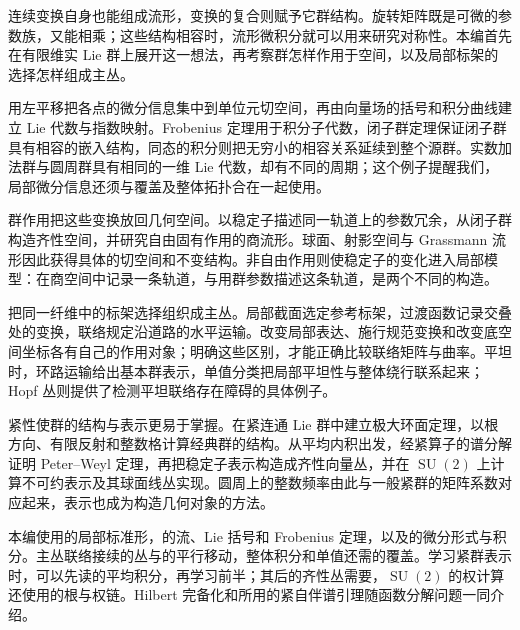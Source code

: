 
% 

\BookPartGuide
连续变换自身也能组成流形，变换的复合则赋予它群结构。旋转矩阵既是可微的参数族，又能相乘；这些结构相容时，流形微积分就可以用来研究对称性。本编首先在有限维实 Lie 群上展开这一想法，再考察群怎样作用于空间，以及局部标架的选择怎样组成主丛。

\ProseParagraphBreak

用左平移把各点的微分信息集中到单位元切空间，再由向量场的括号和积分曲线建立 Lie 代数与指数映射。Frobenius 定理用于积分子代数，闭子群定理保证闭子群具有相容的嵌入结构，同态的积分则把无穷小的相容关系延续到整个源群。实数加法群与圆周群具有相同的一维 Lie 代数，却有不同的周期；这个例子提醒我们，局部微分信息还须与覆盖及整体拓扑合在一起使用。

\ProseParagraphBreak

群作用把这些变换放回几何空间。以稳定子描述同一轨道上的参数冗余，从闭子群构造齐性空间，并研究自由固有作用的商流形。球面、射影空间与 Grassmann 流形因此获得具体的切空间和不变结构。非自由作用则使稳定子的变化进入局部模型：在商空间中记录一条轨道，与用群参数描述这条轨道，是两个不同的构造。

\ProseParagraphBreak

把同一纤维中的标架选择组织成主丛。局部截面选定参考标架，过渡函数记录交叠处的变换，联络规定沿道路的水平运输。改变局部表达、施行规范变换和改变底空间坐标各有自己的作用对象；明确这些区别，才能正确比较联络矩阵与曲率。平坦时，环路运输给出基本群表示，单值分类把局部平坦性与整体绕行联系起来；Hopf 丛则提供了检测平坦联络存在障碍的具体例子。

\ProseParagraphBreak

紧性使群的结构与表示更易于掌握。在紧连通 Lie 群中建立极大环面定理，以根方向、有限反射和整数格计算经典群的结构。从平均内积出发，经紧算子的谱分解证明 Peter--Weyl 定理，再把稳定子表示构造成齐性向量丛，并在 \(\operatorname{SU}(2)\) 上计算不可约表示及其球面线丛实现。圆周上的整数频率由此与一般紧群的矩阵系数对应起来，表示也成为构造几何对象的方法。

\ProseParagraphBreak

本编使用的局部标准形，的流、Lie 括号和 Frobenius 定理，以及的微分形式与积分。主丛联络接续的丛与的平行移动，整体积分和单值还需的覆盖。学习紧群表示时，可以先读的平均积分，再学习前半；其后的齐性丛需要，\(\operatorname{SU}(2)\) 的权计算还使用的根与权链。Hilbert 完备化和所用的紧自伴谱引理随函数分解问题一同介绍。






